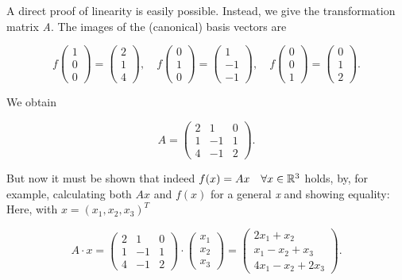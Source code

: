 A direct proof of linearity is easily possible. Instead, we give the transformation matrix \emph{A}. The images of the (canonical) basis vectors are

\[
    f\begin{pmatrix}
    1 \\
    0 \\
    0
    \end{pmatrix} =
    \begin{pmatrix}
    2 \\
    1 \\
    4
    \end{pmatrix} , \quad
    f\begin{pmatrix}
    0 \\
    1 \\
    0
    \end{pmatrix} =
    \begin{pmatrix}
    1 \\
    -1 \\
    -1
    \end{pmatrix} , \quad
    f\begin{pmatrix}
    0 \\
    0 \\
    1
    \end{pmatrix} =
    \begin{pmatrix}
    0 \\
    1 \\
    2
    \end{pmatrix} .
\]

We obtain

\[
    A =
    \begin{pmatrix}
    2 & 1 & 0 \\
    1 & -1 & 1 \\
    4 & -1 & 2
    \end{pmatrix} .
\]

But now it must be shown that indeed \(f(x) = Ax \quad \forall x \in \mathbb{R}^3\) holds, by, 
for example, calculating both \(Ax\) and \(f(x)\) for a 
general \emph{x} and showing equality: Here, with \(x = {(x_1, x_2, x_3)}^T\)

\[
    A \cdot x =
    \begin{pmatrix}
    2 & 1 & 0 \\
    1 & -1 & 1 \\
    4 & -1 & 2
    \end{pmatrix}
    \cdot
    \begin{pmatrix}
    x_1 \\
    x_2 \\
    x_3
    \end{pmatrix} =
    \begin{pmatrix}
    2x_1 + x_2 \\
    x_1 - x_2 + x_3 \\
    4x_1 - x_2 + 2x_3
    \end{pmatrix} .
\]

